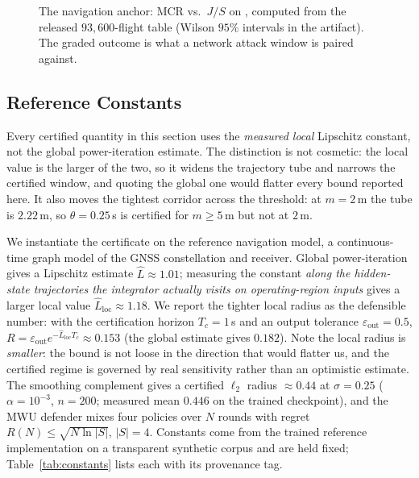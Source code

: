 \begin{figure}[t]
\centering
{}
\caption{The navigation anchor: MCR vs.\ $J/S$ on ,
computed from the released $93{,}600$-flight table (Wilson $95\%$ intervals in
the artifact). The graded outcome is what a network attack window is paired
against.}
\label{fig:mcr}
\end{figure}

\subsection{Reference Constants}
Every certified quantity in this section uses the \emph{measured local}
Lipschitz constant, not the global power-iteration estimate. The distinction
is not cosmetic: the local value is the larger of the two, so it widens the
trajectory tube and narrows the certified window, and quoting the global one
would flatter every bound reported here. It also moves the tightest corridor
across the threshold: at $m{=}2$\,m the tube is $2.22$\,m, so
$\theta{=}0.25$\,s is certified for $m\ge5$\,m but not at $2$\,m.

We instantiate the certificate on the reference navigation model, a
continuous-time graph model of the GNSS constellation and receiver. Global
power-iteration gives a Lipschitz estimate $\hat L\approx1.01$; measuring the
constant \emph{along the hidden-state trajectories the integrator actually
visits on operating-region inputs} gives a larger local value
$\hat L_{\mathrm{loc}}\approx1.18$. We report the tighter local radius as the
defensible number: with the certification horizon $T_c=1$\,s and an output
tolerance $\varepsilon_{\mathrm{out}}=0.5$,
$R=\varepsilon_{\mathrm{out}}e^{-\hat L_{\mathrm{loc}}T_c}\approx0.153$ (the
global estimate gives $0.182$). Note the local radius is \emph{smaller}: the
bound is not loose in the direction that would flatter us, and the certified
regime is governed by real sensitivity rather than an optimistic estimate. The
smoothing complement gives a certified $\ell_2$ radius $\approx0.44$ at
$\sigma=0.25$ ($\alpha=10^{-3}$, $n=200$; measured mean $0.446$ on the trained
checkpoint), and the MWU defender mixes four policies over $N$ rounds with regret
$R(N)\le\sqrt{N\ln|S|}$, $|S|=4$. Constants come from the trained reference
implementation on a transparent synthetic corpus and are held fixed;
Table~\ref{tab:constants} lists each with its provenance tag.

